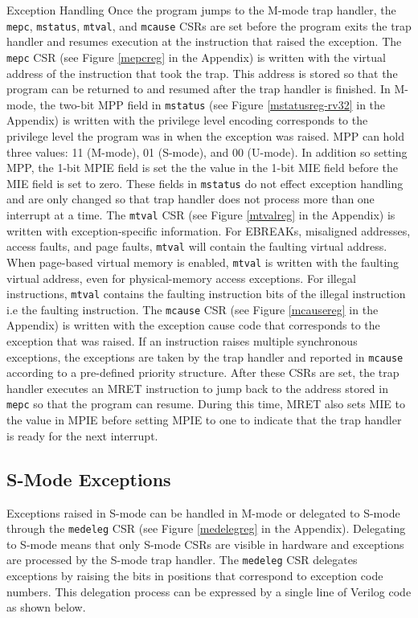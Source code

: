 \documentclass[12pt]{article}
\begin{document}
\begin{section}{Exception Handling}
Once the program jumps to the M-mode trap handler, the {\tt{mepc}}, {\tt{mstatus}}, {\tt{mtval}}, and {\tt{mcause}} CSRs are set before the program exits the trap handler and resumes execution at the instruction that raised the exception. The {\tt{mepc}} CSR (see Figure \ref{mepcreg} in the Appendix) is written with the virtual address of the instruction that took the trap. This address is stored so that the program can be returned to and resumed after the trap handler is finished. In M-mode, the two-bit MPP field in {\tt{mstatus}} (see Figure \ref{mstatusreg-rv32} in the Appendix) is written with the privilege level encoding corresponds to the privilege level the program was in when the exception was raised. MPP can hold three values: 11 (M-mode), 01 (S-mode), and 00 (U-mode). In addition so setting MPP, the 1-bit MPIE field is set the the value in the 1-bit MIE field before the MIE field is set to zero. These fields in {\tt{mstatus}} do not effect exception handling and are only changed so that trap handler does not process more than one interrupt at a time. The {\tt{mtval}} CSR (see Figure \ref{mtvalreg} in the Appendix) is written with exception-specific information. For EBREAKs, misaligned addresses, access faults, and page faults, {\tt{mtval}} will contain the faulting virtual address. When page-based virtual memory is enabled, {\tt{mtval}} is written with the faulting virtual address, even for physical-memory access exceptions. For illegal instructions, {\tt{mtval}} contains the faulting instruction bits of the illegal instruction i.e the faulting instruction. The {\tt{mcause}} CSR (see Figure \ref{mcausereg} in the Appendix) is written with the exception cause code that corresponds to the exception that was raised. If an instruction raises multiple synchronous exceptions, the exceptions are taken by the trap handler and reported in {\tt{mcause}} according to a pre-defined priority structure. After these CSRs are set, the trap handler executes an MRET instruction to jump back to the address stored in {\tt{mepc}} so that the program can resume. During this time, MRET also sets MIE to the value in MPIE before setting MPIE to one to indicate that the trap handler is ready for the next interrupt. 

\subsection{S-Mode Exceptions}
Exceptions raised in S-mode can be handled in M-mode or delegated to S-mode through the {\tt{medeleg}} CSR (see Figure \ref{medelegreg} in the Appendix). Delegating to S-mode means that only S-mode CSRs are visible in hardware and exceptions are processed by the S-mode trap handler. The {\tt{medeleg}} CSR delegates exceptions by raising the bits in positions that correspond to exception code numbers. This delegation process can be expressed by a single line of Verilog code as shown below.  


\end{section}
\end{document}
